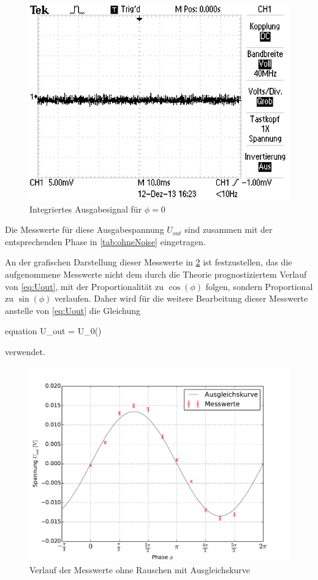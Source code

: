 	
		\begin{figure}[!h]
			\centering
			\includegraphics[scale=0.4]{Grafiken/IntegrierteSpannung.jpg}
			\caption{Integriertes Ausgabesignal für $\phi = 0$}
			\label{fig:Uout}
		\end{figure} 
	
	Die Messwerte für diese Ausgabespannung $U_{out}$ sind zusammen mit der entsprechenden Phase in \cref{tab:ohneNoise} eingetragen. 

	
	
	An der grafischen Darstellung dieser Messwerte in \cref{fig:ohneNoise} ist festzustellen, das die aufgenommene Messwerte nicht dem
	durch die Theorie prognostiziertem Verlauf von \cref{eq:Uout}, mit der Proportionalität zu $\cos(\phi)$ folgen, sondern Proportional 
	zu $\sin(\phi)$ verlaufen. Daher wird für die weitere Bearbeitung dieser Messwerte anstelle von \cref{eq:Uout} die Gleichung 
	\begin{empheq}{equation}
			U_{out} = U_{0}\sin(\phi)
			\label{eq:Uout_sin}
	\end{empheq}     
	verwendet.   
	
		\begin{figure}[!h]
			\centering
			\includegraphics[scale=0.75]{Grafiken/OhneNoise.pdf}
			\caption{Verlauf der Messwerte ohne Rauschen mit Ausgleichskurve}
			\label{fig:ohneNoise}
		\end{figure} 
	
